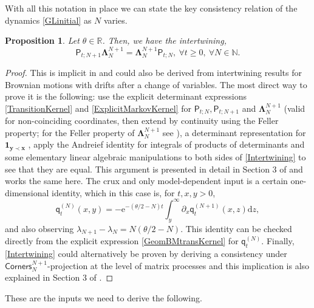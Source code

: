 \documentclass[]{article}
\newtheorem{prop}[thm]{Proposition}
\begin{document}
With all this notation in place we can state the key consistency relation of the dynamics \eqref{GLinitial} as $N$ varies.



\begin{prop}\label{PropConsistency}
Let $\theta \in \mathbb{R}$. Then, we have the intertwining,
\begin{equation}\label{Intertwining}
\mathsf{P}_{t;N+1}\boldsymbol{\Lambda}_N^{N+1}=\boldsymbol{\Lambda}_N^{N+1}\mathsf{P}_{t;N}, \ \forall t \ge 0, \ \forall N \in \mathbb{N}.
\end{equation}
\end{prop}

\begin{proof}
This is implicit in \cite{Interlacing} and could also be derived from intertwining results \cite{OConnellRSK} for Brownian motions with drifts after a change of variables. The most direct way to prove it is the following: use the explicit determinant expressions \eqref{TransitionKernel} and  \eqref{ExplicitMarkovKernel} for $\mathsf{P}_{t;N}, \mathsf{P}_{t;N+1}$ and $\boldsymbol{\Lambda}_N^{N+1}$ (valid for non-coinciding coordinates, then extend by continuity using the Feller property; for the Feller property of $\boldsymbol{\Lambda}_N^{N+1}$ see \cite{AM24}), a determinant representation for $\mathbf{1}_{\mathbf{y}\prec \mathbf{x}}$ \cite{Warren}, apply the Andreief identity for integrals of products of determinants and some elementary linear algebraic manipulations to both sides of \eqref{Intertwining} to see that they are equal. This argument is presented in detail in Section 3 of \cite{AM24} and works the same here. The crux and only model-dependent input is a certain one-dimensional identity, which in this case is, for $t,x,y>0$,
\begin{equation*}
\mathsf{q}_t^{(N)}(x,y)=-\mathrm{e}^{-(\theta/2-N)t}\int_y^\infty \partial_x\mathsf{q}_t^{(N+1)}(x,z)\mathrm{d}z,
\end{equation*}
and also observing $\lambda_{N+1}-\lambda_N=N(\theta/2-N)$. This identity can be checked directly from the explicit expression \eqref{GeomBMtransKernel} for $\mathsf{q}_t^{(N)}$. Finally, \eqref{Intertwining} could alternatively be proven by deriving a consistency under $\mathsf{Corners}_{N}^{N+1}$-projection at the level of matrix processes and this implication is also explained in Section 3 of \cite{AM24}.
\end{proof}

These are the inputs we need to derive the following.
\end{document}
